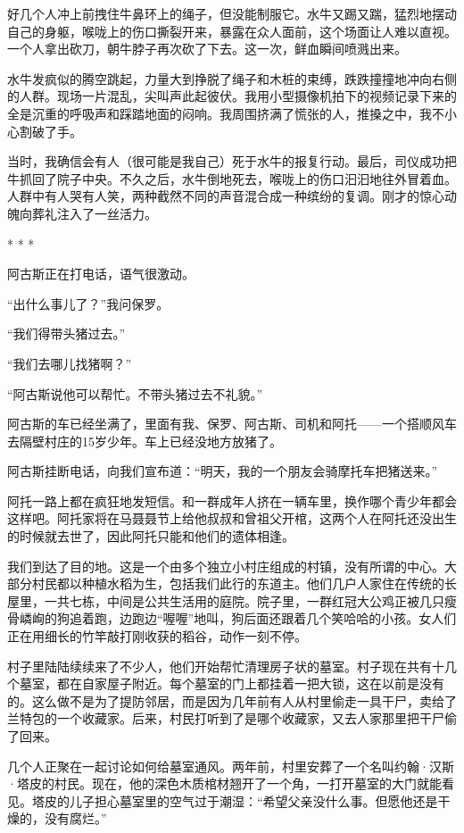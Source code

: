 \documentclass[12pt,oneside]{book}
\begin{document}
\begin{bookref}[frametitle={\cite{好好告别}}]
好几个人冲上前拽住牛鼻环上的绳子，但没能制服它。水牛又踢又踹，猛烈地摆动自己的身躯，喉咙上的伤口撕裂开来，暴露在众人面前，这个场面让人难以直视。一个人拿出砍刀，朝牛脖子再次砍了下去。这一次，鲜血瞬间喷溅出来。

水牛发疯似的腾空跳起，力量大到挣脱了绳子和木桩的束缚，跌跌撞撞地冲向右侧的人群。现场一片混乱，尖叫声此起彼伏。我用小型摄像机拍下的视频记录下来的全是沉重的呼吸声和踩踏地面的闷响。我周围挤满了慌张的人，推搡之中，我不小心割破了手。

当时，我确信会有人（很可能是我自己）死于水牛的报复行动。最后，司仪成功把牛抓回了院子中央。不久之后，水牛倒地死去，喉咙上的伤口汩汩地往外冒着血。人群中有人哭有人笑，两种截然不同的声音混合成一种缤纷的复调。刚才的惊心动魄向葬礼注入了一丝活力。

\begin{center}
* * *
\end{center}

阿古斯正在打电话，语气很激动。

“出什么事儿了？”我问保罗。

“我们得带头猪过去。”

“我们去哪儿找猪啊？”

“阿古斯说他可以帮忙。不带头猪过去不礼貌。”

阿古斯的车已经坐满了，里面有我、保罗、阿古斯、司机和阿托——一个搭顺风车去隔壁村庄的15岁少年。车上已经没地方放猪了。

阿古斯挂断电话，向我们宣布道：“明天，我的一个朋友会骑摩托车把猪送来。”

阿托一路上都在疯狂地发短信。和一群成年人挤在一辆车里，换作哪个青少年都会这样吧。阿托家将在马聂聂节上给他叔叔和曾祖父开棺，这两个人在阿托还没出生的时候就去世了，因此阿托只能和他们的遗体相逢。

我们到达了目的地。这是一个由多个独立小村庄组成的村镇，没有所谓的中心。大部分村民都以种植水稻为生，包括我们此行的东道主。他们几户人家住在传统的长屋里，一共七栋，中间是公共生活用的庭院。院子里，一群红冠大公鸡正被几只瘦骨嶙峋的狗追着跑，边跑边“喔喔”地叫，狗后面还跟着几个笑哈哈的小孩。女人们正在用细长的竹竿敲打刚收获的稻谷，动作一刻不停。

村子里陆陆续续来了不少人，他们开始帮忙清理房子状的墓室。村子现在共有十几个墓室，都在自家屋子附近。每个墓室的门上都挂着一把大锁，这在以前是没有的。这么做不是为了提防邻居，而是因为几年前有人从村里偷走一具干尸，卖给了兰特包的一个收藏家。后来，村民打听到了是哪个收藏家，又去人家那里把干尸偷了回来。

几个人正聚在一起讨论如何给墓室通风。两年前，村里安葬了一个名叫约翰·汉斯·塔皮的村民。现在，他的深色木质棺材翘开了一个角，一打开墓室的大门就能看见。塔皮的儿子担心墓室里的空气过于潮湿：“希望父亲没什么事。但愿他还是干燥的，没有腐烂。”


\end{bookref}
\end{document}
